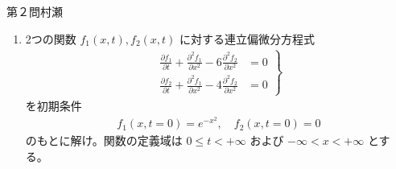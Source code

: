 \begin{question}{第２問}{村瀬}
\begin{enumerate}
\item
  2つの関数 $f_1(x, t), f_2(x, t)$ に対する連立偏微分方程式
  \begin{align*}
    \left.\begin{aligned}
      \frac{\partial f_1}{\partial t}
      + \frac{\partial^2 f_1}{\partial x^2}
      -6 \frac{\partial^2 f_2}{\partial x^2} &= 0\\
      \frac{\partial f_2}{\partial t}
      + \frac{\partial^2 f_1}{\partial x^2}
      -4 \frac{\partial^2 f_2}{\partial x^2} &= 0
    \end{aligned}\right\}
  \end{align*}
  を初期条件
  \begin{align*}
    f_1(x, t=0)=e^{-x^2},\quad
    f_2(x, t=0)=0
  \end{align*}
  のもとに解け。関数の定義域は $0\le t<+\infty$ および $-\infty<x<+\infty$ とする。
\end{enumerate}
\end{question}
